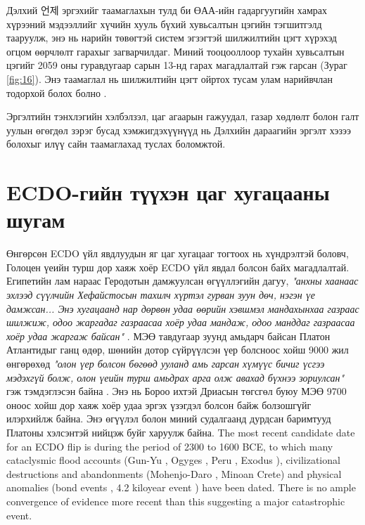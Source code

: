 \documentclass[10pt,twocolumn,letterpaper]{article}
\begin{document}
Дэлхий 언제 эргэхийг таамаглахын тулд би ӨАА-ийн гадаргуугийн хамрах хүрээний мэдээллийг хүчийн хууль бүхий хувьсалтын цэгийн тэгшитгэлд тааруулж, энэ нь нарийн төвөгтэй систем эгзэгтэй шилжилтийн цэгт хүрэхэд огцом өөрчлөлт гарахыг загварчилдаг. Миний тооцооллоор тухайн хувьсалтын цэгийг 2059 оны гуравдугаар сарын 13-нд гарах магадлалтай гэж гарсан (Зураг \ref{fig:16}). Энэ таамаглал нь шилжилтийн цэгт ойртох тусам улам нарийвчлан тодорхой болох болно \cite{136}.

Эргэлтийн тэнхлэгийн хэлбэлзэл, цаг агаарын гажуудал, газар хөдлөлт болон галт уулын өгөгдөл зэрэг бусад хэмжигдэхүүнүүд нь Дэлхийн дараагийн эргэлт хэзээ болохыг илүү сайн таамаглахад туслах боломжтой.

\section{ECDO-гийн түүхэн цаг хугацааны шугам}

Өнгөрсөн ECDO үйл явдлуудын яг цаг хугацааг тогтоох нь хүндрэлтэй боловч, Голоцен үеийн турш дор хаяж хоёр ECDO үйл явдал болсон байх магадлалтай. Египетийн лам нараас Геродотын дамжуулсан өгүүллэгийн дагуу, \textit{"анхны хаанаас эхлээд сүүлчийн Хефайстосын тахилч хүртэл гурван зуун дөч, нэгэн үе дамжсан... Энэ хугацаанд нар дөрвөн удаа өөрийн хэвшмэл мандахынхаа газраас шилжиж, одоо жаргадаг газраасаа хоёр удаа мандаж, одоо манддаг газраасаа хоёр удаа жаргаж байсан"} \cite{32}. МЭӨ тавдугаар зуунд амьдарч байсан Платон \cite{111} Атлантидыг ганц өдөр, шөнийн дотор сүйрүүлсэн үер болсноос хойш 9000 жил өнгөрөхөд \textit{"олон үер болсон бөгөөд ууланд амь гарсан хүмүүс бичиг үсгээ мэдэхгүй болж, олон үеийн турш амьдрах арга олж авахад бүхнээ зориулсан"} гэж тэмдэглэсэн байна \cite{112}. Энэ нь Бороо ихтэй Дриасын төгсгөл буюу МЭӨ 9700 оноос хойш дор хаяж хоёр удаа эргэх үзэгдэл болсон байж болзошгүйг илэрхийлж байна. Энэ өгүүлэл болон миний судалгаанд \cite{2} дурдсан баримтууд Платоны хэлсэнтэй нийцэж буйг харуулж байна.
The most recent candidate date for an ECDO flip is during the period of 2300 to 1600 BCE, to which many cataclysmic flood accounts (Gun-Yu \cite{113,114,115}, Ogyges \cite{116,117}, Peru \cite{118,119}, Exodus \cite{120}), civilizational destructions and abandonments (Mohenjo-Daro \cite{121}, Minoan Crete\cite{100,101}) and physical anomalies (bond events \cite{122}, 4.2 kiloyear event \cite{90}) have been dated. There is no ample convergence of evidence more recent than this suggesting a major catastrophic event.
\end{document}
